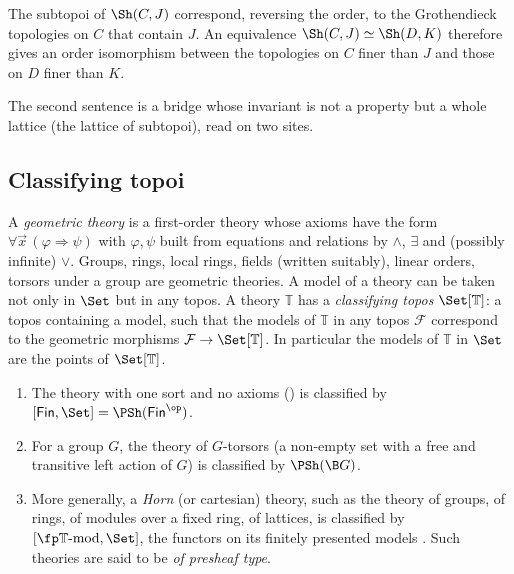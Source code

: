 \begin{bridge}[Subtopoi]\label{br:sub}
The subtopoi of $\Sh(C,J)$ correspond, reversing the order, to the Grothendieck topologies on $C$ that contain $J$. An equivalence $\Sh(C,J)\simeq\Sh(D,K)$ therefore gives an order isomorphism between the topologies on $C$ finer than $J$ and those on $D$ finer than $K$.
\end{bridge}


The second sentence is a bridge whose invariant is not a property but a whole lattice (the lattice of subtopoi), read on two sites.

\subsection{Classifying topoi}

A \emph{geometric theory} is a first-order theory whose axioms have the form $\forall\vec x\,(\varphi\Rightarrow\psi)$ with $\varphi,\psi$ built from equations and relations by $\wedge$, $\exists$ and (possibly infinite) $\vee$. Groups, rings, local rings, fields (written suitably), linear orders, torsors under a group are geometric theories. A model of a theory can be taken not only in $\Set$ but in any topos. A theory $\mathbb T$ has a \emph{classifying topos} $\Set[\mathbb T]$: a topos containing a  model, such that the models of $\mathbb T$ in any topos $\mathcal F$ correspond to the geometric morphisms $\mathcal F\to\Set[\mathbb T]$. In particular the models of $\mathbb T$ in $\Set$ are the points of $\Set[\mathbb T]$.

\begin{example}\label{ex:classifying}
\begin{enumerate}
\item The theory with one sort and no axioms () is classified by $[\mathsf{Fin},\Set] = \PSh(\mathsf{Fin}^{\op})$.
\item For a group $G$, the theory of $G$-torsors (a non-empty set with a free and transitive left action of $G$) is classified by $\PSh(\B G)$.
\item More generally, a \emph{Horn} (or cartesian) theory, such as the theory of groups, of rings, of modules over a fixed ring, of lattices, is classified by $[\fp\mathbb T\text{-mod},\Set]$, the functors on its finitely presented models \cite[ch.~6]{caramello-tst}. Such theories are said to be \emph{of presheaf type}.
\end{enumerate}
\end{example}

